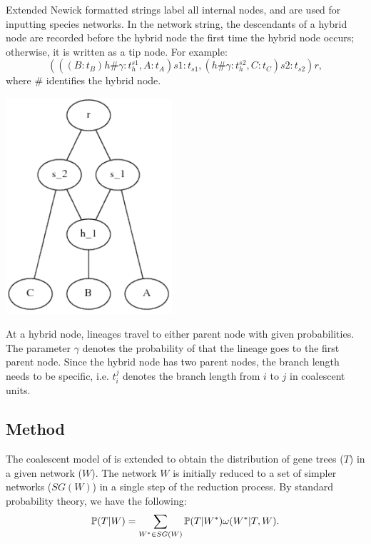 Extended Newick formatted strings \citep{Cardona12008,Huson2010} label all internal nodes, and are used for inputting species networks. In the network string, the descendants of a hybrid node are recorded before the hybrid node the first time the hybrid node occurs; otherwise, it is written as a tip node. For example:
\begin{equation}
(((B:t_B)h\#\gamma:t^{s1}_{h},A:t_A)s1:t_{s1},(h\#\gamma:t^{s2}_{h},C:t_{C})s2:t_{s2})r,\label{coal_man:ext_no_root}
\end{equation}
where $\#$ identifies the hybrid node.
\begin{center}
\includegraphics[height=8cm]{net_eg.pdf}
\end{center}
\indent At a hybrid node, lineages travel to either parent node with given probabilities. The parameter $\gamma$ denotes the probability of that the lineage goes to the first parent node.
Since the hybrid node has two parent nodes, the branch length needs to be specific, i.e. $t_{i}^j$ denotes the branch length from $i$ to $j$ in coalescent units.

\subsection{Method}
The coalescent model of \citet{Degnan2005} is extended to obtain the distribution of gene trees ($T$) in a given network ($W$). The network $W$ is initially reduced to a set of simpler networks ($SG(W)$) in a single step of the reduction process. By standard probability theory, we have the following:
\begin{equation*}{\mathbb P}(T|W)=\sum_{W^*\in SG(W)}{\mathbb P}(T|W^*)\omega(W^*|T, W).
\label{coal_man:eqn:recursion}\end{equation*}

